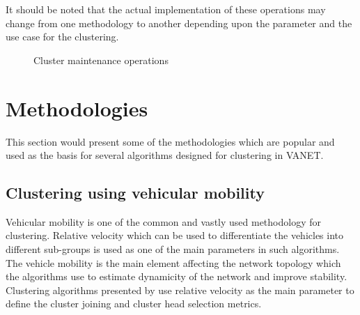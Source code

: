 \documentclass[]{ccs-thesis}
\begin{document}
It should be noted that the actual implementation of these operations may change from one methodology to another depending upon the parameter and the
use case for the clustering.

\begin{figure}[h]
    \centering
    \vfill%

    \caption{Cluster maintenance operations}
    \label{fig:maintenance}
\end{figure}

\section{Methodologies}

This section would present some of the methodologies which are popular and used as the basis for several algorithms designed for clustering
in \ac{VANET}.

\subsection{Clustering using vehicular mobility}

Vehicular mobility is one of the common and vastly used methodology for clustering. Relative velocity which can be used to differentiate
the vehicles into different sub-groups is used as one of the main parameters in such algorithms. The vehicle mobility is the main element
affecting the network topology which the algorithms use to estimate dynamicity of the network and improve stability. Clustering algorithms
presented by \textcite{ARKIAN2014197, 6737622, 6077004} use relative velocity as the main parameter to define the cluster joining and cluster
head selection metrics.
\end{document}
